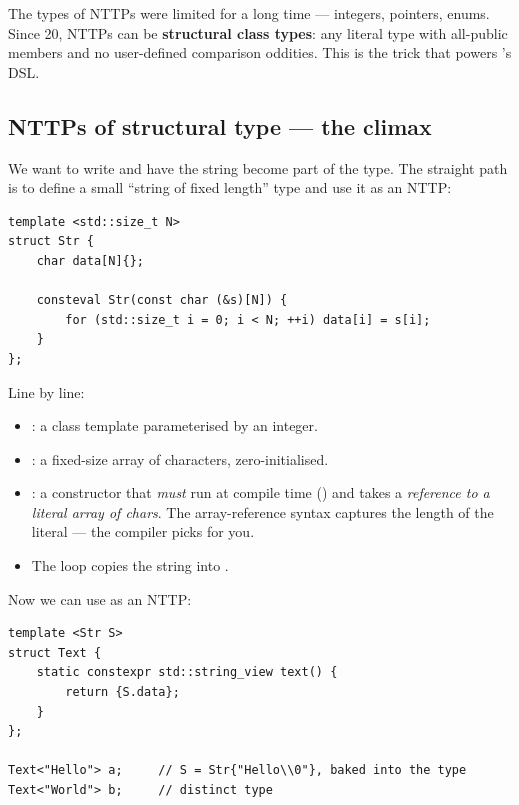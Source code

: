 The types of NTTPs were limited for a long time --- integers,
pointers, enums. Since \cpp{}20, NTTPs can be \textbf{structural
class types}: any literal type with all-public members and no
user-defined comparison oddities. This is the trick that powers
\maya{}'s DSL.

\subsection{NTTPs of structural type --- the climax}

We want to write  and have the string become part of
the type. The straight path is to define a small ``string of fixed
length'' type and use it as an NTTP:

\begin{lstlisting}
template <std::size_t N>
struct Str {
    char data[N]{};

    consteval Str(const char (&s)[N]) {
        for (std::size_t i = 0; i < N; ++i) data[i] = s[i];
    }
};
\end{lstlisting}

Line by line:

\begin{itemize}[leftmargin=*]
  \item {}: a class template
    parameterised by an integer.
  \item {}: a fixed-size array of 
    characters, zero-initialised.
  \item {}: a constructor that
    \emph{must} run at compile time () and takes a
    \emph{reference to a literal array of  chars}. The
    array-reference syntax  captures the length of
    the literal --- the compiler picks  for you.
  \item The loop copies the string into .
\end{itemize}

Now we can use  as an NTTP:

\begin{lstlisting}
template <Str S>
struct Text {
    static constexpr std::string_view text() {
        return {S.data};
    }
};

Text<"Hello"> a;     // S = Str{"Hello\\0"}, baked into the type
Text<"World"> b;     // distinct type
\end{lstlisting}

